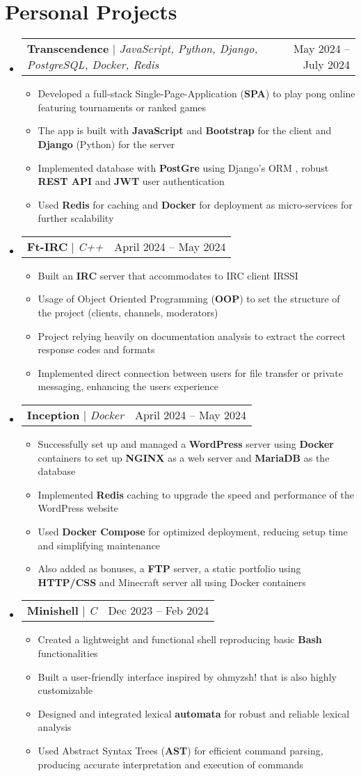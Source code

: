 \documentclass[letterpaper,11pt]{article}
\makeatletter
\newcommand{\resumeItem}[1]{
  \item\small{
    {#1 \vspace{-2pt}}
  }
}
\newcommand{\resumeProjectHeading}[2]{
    \item
    \begin{tabular*}{0.97\textwidth}{l@{\extracolsep{\fill}}r}
      \small#1 & #2 \\
    \end{tabular*}\vspace{-7pt}
}
\newcommand{\resumeSubHeadingListStart}{\begin{itemize}[leftmargin=0.15in, label={}]}
\newcommand{\resumeSubHeadingListEnd}{\end{itemize}}
\newcommand{\resumeItemListStart}{\begin{itemize}}
\newcommand{\resumeItemListEnd}{\end{itemize}\vspace{-5pt}}
\makeatother
\begin{document}

\section{Personal Projects}
    \vspace{2pt}
    \resumeSubHeadingListStart
        \resumeProjectHeading
          {\textbf{Transcendence} $|$ \emph{JavaScript, Python, Django, PostgreSQL, Docker, Redis}}{May 2024 -- July 2024}
          \resumeItemListStart
            \resumeItem{Developed a full-stack Single-Page-Application (\textbf{SPA}) to play pong online featuring tournaments or ranked games}
            \resumeItem{The app is built with \textbf{JavaScript} and \textbf{Bootstrap} for the client and \textbf{Django} (Python) for the server}
            \resumeItem{Implemented database with \textbf{PostGre} using Django's ORM , robust \textbf{REST API} and \textbf{JWT} user authentication}
            \resumeItem{Used \textbf{Redis} for caching and \textbf{Docker} for deployment as micro-services for further scalability}
          \resumeItemListEnd
        \resumeProjectHeading
          {\textbf{Ft-IRC} $|$ \emph{C++}}{April 2024 -- May 2024}
          \resumeItemListStart
            \resumeItem{Built an \textbf{IRC} server that accommodates to IRC client IRSSI}
            \resumeItem{Usage of Object Oriented Programming (\textbf{OOP}) to set the structure of the project (clients, channels, moderators)}
            \resumeItem{Project relying heavily on documentation analysis to extract the correct response codes and formats}
            \resumeItem{Implemented direct connection between users for file transfer or private messaging, enhancing the users experience}
          \resumeItemListEnd
        \resumeProjectHeading
          {\textbf{Inception} $|$ \emph{Docker}}{April 2024 -- May 2024}
          \resumeItemListStart
            \resumeItem{Successfully set up and managed a \textbf{WordPress} server using \textbf{Docker} containers to set up \textbf{NGINX} as a web server and \textbf{MariaDB} as the database}
            \resumeItem{Implemented \textbf{Redis} caching to upgrade the speed and performance of the WordPress website}
            \resumeItem{Used \textbf{Docker Compose} for optimized deployment, reducing setup time and simplifying maintenance}
            \resumeItem{Also added as bonuses, a \textbf{FTP} server, a static portfolio using \textbf{HTTP/CSS} and Minecraft server all using Docker containers}
          \resumeItemListEnd
        \resumeProjectHeading
          {\textbf{Minishell} $|$ \emph{C}}{Dec 2023 -- Feb 2024}
          \resumeItemListStart
            \resumeItem{Created a lightweight and functional shell reproducing basic \textbf{Bash} functionalities}
            \resumeItem{Built a user-friendly interface inspired by ohmyzsh! that is also highly customizable}
            \resumeItem{Designed and integrated lexical \textbf{automata} for robust and reliable lexical analysis}
            \resumeItem{Used Abstract Syntax Trees (\textbf{AST}) for efficient command parsing, producing accurate interpretation and execution of commands}
          \resumeItemListEnd
    \resumeSubHeadingListEnd
\end{document}
